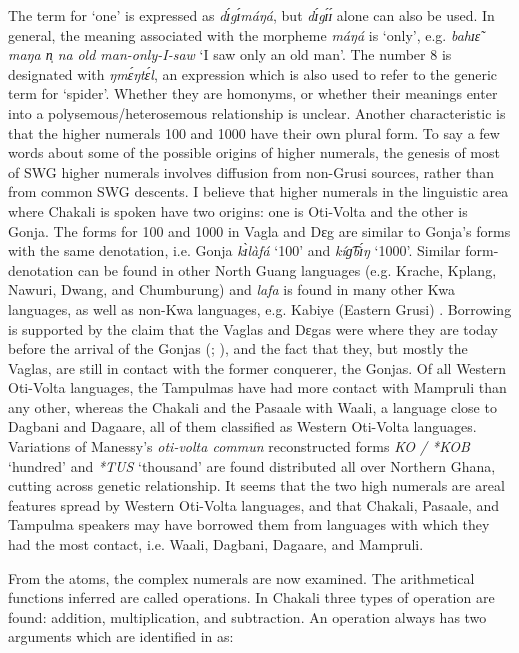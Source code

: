 \begin{exe}
\begin{exe}
\begin{exe}
{\begin{exe}
\begin{exe}
\begin{exe}
\begin{exe}
\begin{exe}
\begin{exe}
\begin{exe}
\begin{xlist}
\begin{exe}
\begin{exe}
\begin{exe}
The term for `one'  is expressed  as  {\it dɪ́gɪ́máŋá},  but  {\it dɪ́gɪ́ɪ́}
alone  can also
be used. In general, the meaning associated with the morpheme {\it máŋá} is
`only', e.g.  {\it bahɪɛ̃ maŋa n̩ na} {\it old man-only-I-saw} `I saw only an 
old
man'. 
 The number 8 is designated with  {\it ŋmɛ́ŋtɛ́l}, an expression which is also
used to refer to the generic term for  `spider'.  Whether they are homonyms,
or whether
 their
meanings enter into a polysemous/heterosemous relationship is unclear. Another
characteristic is that the higher
numerals 100 and 1000  have their own plural form. To say a few words about 
some of the possible origins of higher numerals, the genesis of most of SWG 
higher numerals involves diffusion from non-Grusi sources, rather than from  
common SWG descents. I believe that higher numerals in the linguistic area 
where Chakali is spoken have two origins: one is Oti-Volta and the other is 
Gonja. The  forms for 100 and 1000  in Vagla and Dɛg  are similar
to Gonja's forms with the same
denotation, i.e. Gonja {\it  kɪ̀làfá} `100' and  {\it  kíɡ͡bɪ́ŋ} `1000'.  
Similar
form-denotation can be found in other North Guang languages (e.g.
Krache, Kplang, Nawuri, Dwang, and Chumburung) and {\it lafa} is found in many
other Kwa languages, as well as  non-Kwa languages, e.g. Kabiye (Eastern
Grusi)  \citep{Chan09}. Borrowing is  supported by the claim that the Vaglas
and Dɛgas were where they are today before the arrival of the Gonjas
(\citealt[12-13]{Good54}; \citealt[516]{Ratt32a}), and the fact that they, but
mostly the Vaglas, are still in contact with the former conquerer, the Gonjas. 
Of all Western  Oti-Volta languages, the Tampulmas have had more contact with
Mampruli  than any other, whereas the Chakali and the Pasaale
with Waali, a language close to  Dagbani and Dagaare, all of them classified as
Western  Oti-Volta languages. Variations of Manessy's {\it oti-volta commun}
reconstructed forms {\it *KO / *KOB}  `hundred'  and {\it 
*TUS}  `thousand'  are found
distributed all over Northern
Ghana, cutting across genetic relationship.  It seems that the two high
numerals are areal features spread by Western  Oti-Volta languages,   and that
Chakali, Pasaale, and Tampulma speakers may  have borrowed them from languages 
with which they had the most contact, i.e.   Waali, Dagbani, Dagaare,  and 
Mampruli.

From the atoms,  the complex numerals are now examined. The arithmetical 
functions inferred are called operations. In Chakali three types of operation 
are found: addition, multiplication, and subtraction. An operation always has 
two arguments which are identified in \citet{Gree78b} as: 


\end{exe}
\end{exe}
\end{exe}
\end{xlist}
\end{exe}
\end{exe}
\end{exe}
\end{exe}
\end{exe}
\end{exe}
\end{exe}}
\end{exe}
\end{exe}
\end{exe}
